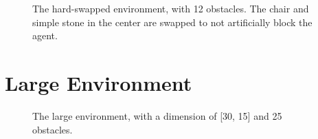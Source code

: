 \begin{figure}[H]
    \centering
    \caption{The hard-swapped environment, with 12 obstacles. The chair and simple stone in the center are swapped to not artificially block the agent.}
    \label{fig:hard_swapped_flat}
\end{figure}

\section{Large Environment}
\begin{figure}[H]
    \centering
    \caption{The large environment, with a dimension of [30, 15] and 25 obstacles.}
    \label{fig:large_flat}
\end{figure}